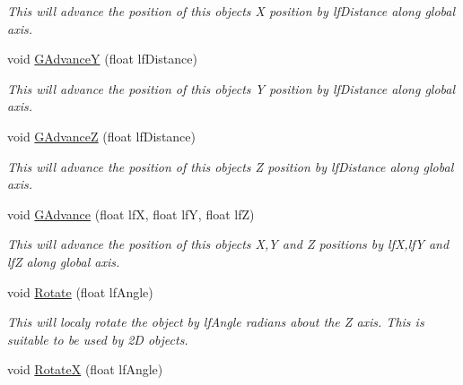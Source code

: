 \begin{DoxyCompactItemize}
\begin{DoxyCompactList}\small\item\em This will advance the position of this objects X position by lfDistance along global axis. \end{DoxyCompactList}\item 
\hypertarget{classc_camera_matrix4_a7cb5d64085acdcc74dcad1e965a52b3b}{
void \hyperlink{classc_camera_matrix4_a7cb5d64085acdcc74dcad1e965a52b3b}{GAdvanceY} (float lfDistance)}
\label{classc_camera_matrix4_a7cb5d64085acdcc74dcad1e965a52b3b}

\begin{DoxyCompactList}\small\item\em This will advance the position of this objects Y position by lfDistance along global axis. \end{DoxyCompactList}\item 
\hypertarget{classc_camera_matrix4_afd68814e78dd2ffaec2f9bc4289aca36}{
void \hyperlink{classc_camera_matrix4_afd68814e78dd2ffaec2f9bc4289aca36}{GAdvanceZ} (float lfDistance)}
\label{classc_camera_matrix4_afd68814e78dd2ffaec2f9bc4289aca36}

\begin{DoxyCompactList}\small\item\em This will advance the position of this objects Z position by lfDistance along global axis. \end{DoxyCompactList}\item 
\hypertarget{classc_camera_matrix4_a342b888f43a65b6c4a14b818c2519157}{
void \hyperlink{classc_camera_matrix4_a342b888f43a65b6c4a14b818c2519157}{GAdvance} (float lfX, float lfY, float lfZ)}
\label{classc_camera_matrix4_a342b888f43a65b6c4a14b818c2519157}

\begin{DoxyCompactList}\small\item\em This will advance the position of this objects X,Y and Z positions by lfX,lfY and lfZ along global axis. \end{DoxyCompactList}\item 
\hypertarget{classc_camera_matrix4_a1de293dc89d68f1688098dc82a1c2655}{
void \hyperlink{classc_camera_matrix4_a1de293dc89d68f1688098dc82a1c2655}{Rotate} (float lfAngle)}
\label{classc_camera_matrix4_a1de293dc89d68f1688098dc82a1c2655}

\begin{DoxyCompactList}\small\item\em This will localy rotate the object by lfAngle radians about the Z axis. This is suitable to be used by 2D objects. \end{DoxyCompactList}\item 
\hypertarget{classc_camera_matrix4_abb8a5e1d961915829f3200b74319af61}{
void \hyperlink{classc_camera_matrix4_abb8a5e1d961915829f3200b74319af61}{RotateX} (float lfAngle)}
\label{classc_camera_matrix4_abb8a5e1d961915829f3200b74319af61}


\end{DoxyCompactItemize}
